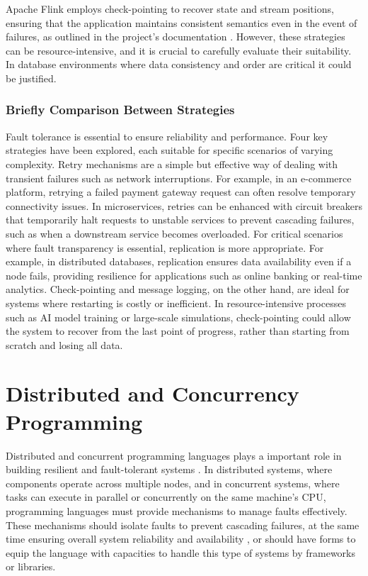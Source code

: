 Apache Flink employs check-pointing to recover state and stream positions, ensuring that the application maintains consistent semantics even in the event of failures, as outlined in the project's documentation \cite{apache-flick}. However, these strategies can be resource-intensive, and it is crucial to carefully evaluate their suitability. In database environments where data consistency and order are critical it could be justified.

\subsubsection{Briefly Comparison Between Strategies}

Fault tolerance is essential to ensure reliability and performance. Four key strategies have been explored, each suitable for specific scenarios of varying complexity. Retry mechanisms are a simple but effective way of dealing with transient failures such as network interruptions. For example, in an e-commerce platform, retrying a failed payment gateway request can often resolve temporary connectivity issues. In microservices, retries can be enhanced with circuit breakers that temporarily halt requests to unstable services to prevent cascading failures, such as when a downstream service becomes overloaded. For critical scenarios where fault transparency is essential, replication is more appropriate. For example, in distributed databases, replication ensures data availability even if a node fails, providing resilience for applications such as online banking or real-time analytics. Check-pointing and message logging, on the other hand, are ideal for systems where restarting is costly or inefficient. In resource-intensive processes such as \gls{AI} model training or large-scale simulations, check-pointing could allow the system to recover from the last point of progress, rather than starting from scratch and losing all data. 




\section{Distributed and Concurrency Programming}

Distributed and concurrent programming languages plays a important role in building resilient and fault-tolerant systems \cite{Armstrong2013}. In distributed systems, where components operate across multiple nodes, and in concurrent systems, where tasks can execute in parallel or concurrently on the same machine's \gls{CPU}, programming languages must provide mechanisms to manage faults effectively. These mechanisms should isolate faults to prevent cascading failures, at the same time ensuring overall system reliability and availability \cite{Nystrom2009}, or should have forms to equip the language with capacities to handle this type of systems by frameworks or libraries.

